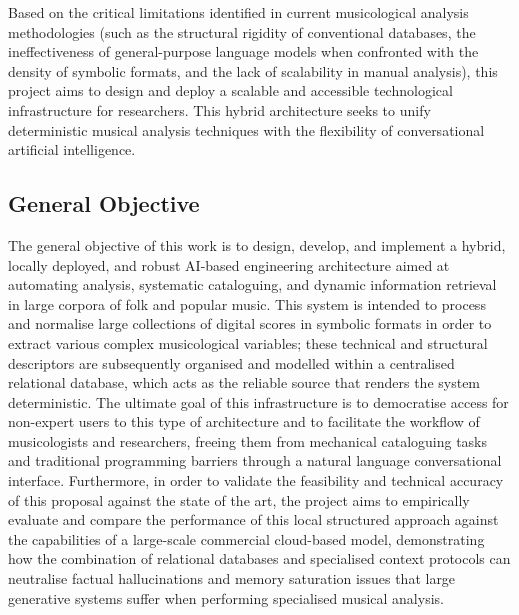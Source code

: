 Based on the critical limitations identified in current musicological analysis methodologies (such as the structural rigidity of conventional databases, the ineffectiveness of general-purpose language models when confronted with the density of symbolic formats, and the lack of scalability in manual analysis), this project aims to design and deploy a scalable and accessible technological infrastructure for researchers. This hybrid architecture seeks to unify deterministic musical analysis techniques with the flexibility of conversational artificial intelligence.

\subsection{General Objective}

The general objective of this work is to design, develop, and implement a hybrid, locally deployed, and robust AI-based engineering architecture aimed at automating analysis, systematic cataloguing, and dynamic information retrieval in large corpora of folk and popular music. This system is intended to process and normalise large collections of digital scores in symbolic formats in order to extract various complex musicological variables; these technical and structural descriptors are subsequently organised and modelled within a centralised relational database, which acts as the reliable source that renders the system deterministic. The ultimate goal of this infrastructure is to democratise access for non-expert users to this type of architecture and to facilitate the workflow of musicologists and researchers, freeing them from mechanical cataloguing tasks and traditional programming barriers through a natural language conversational interface. Furthermore, in order to validate the feasibility and technical accuracy of this proposal against the state of the art, the project aims to empirically evaluate and compare the performance of this local structured approach against the capabilities of a large-scale commercial cloud-based model, demonstrating how the combination of relational databases and specialised context protocols can neutralise factual hallucinations and memory saturation issues that large generative systems suffer when performing specialised musical analysis.

